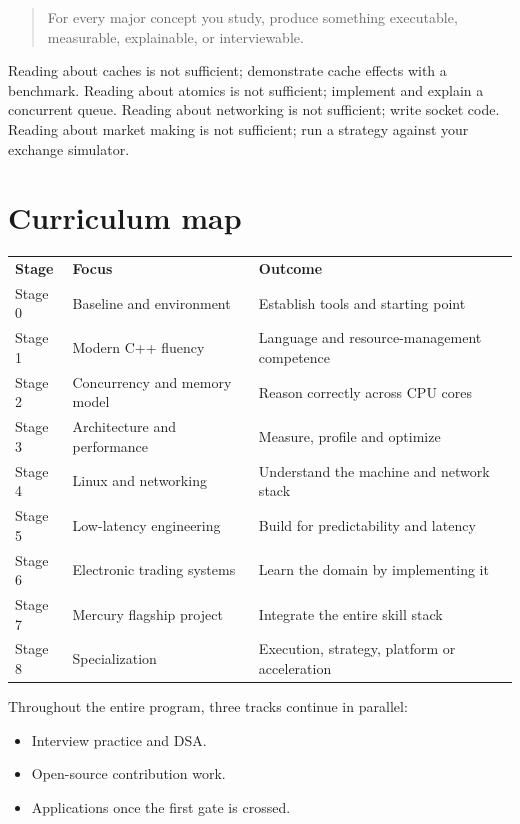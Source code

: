 \documentclass[11pt,letterpaper]{article}
\begin{document}
\begin{quote}
For every major concept you study, produce something executable, measurable, explainable, or interviewable.
\end{quote}

Reading about caches is not sufficient; demonstrate cache effects with a benchmark. Reading about atomics is not sufficient; implement and explain a concurrent queue. Reading about networking is not sufficient; write socket code. Reading about market making is not sufficient; run a strategy against your exchange simulator.

\section{Curriculum map}\label{sec:3}

\begin{center}
\small
\begin{tabular}{>{\raggedright\arraybackslash}p{}>{\raggedright\arraybackslash}p{}>{\raggedright\arraybackslash}p{}}
\textbf{Stage} & \textbf{Focus} & \textbf{Outcome} \\
Stage 0 & Baseline and environment & Establish tools and starting point \\
Stage 1 & Modern C++ fluency & Language and resource-management competence \\
Stage 2 & Concurrency and memory model & Reason correctly across CPU cores \\
Stage 3 & Architecture and performance & Measure, profile and optimize \\
Stage 4 & Linux and networking & Understand the machine and network stack \\
Stage 5 & Low-latency engineering & Build for predictability and latency \\
Stage 6 & Electronic trading systems & Learn the domain by implementing it \\
Stage 7 & Mercury flagship project & Integrate the entire skill stack \\
Stage 8 & Specialization & Execution, strategy, platform or acceleration \\
\end{tabular}
\end{center}

Throughout the entire program, three tracks continue in parallel:

\begin{itemize}

\item Interview practice and DSA.

\item Open-source contribution work.

\item Applications once the first gate is crossed.

\end{itemize}
\end{document}
